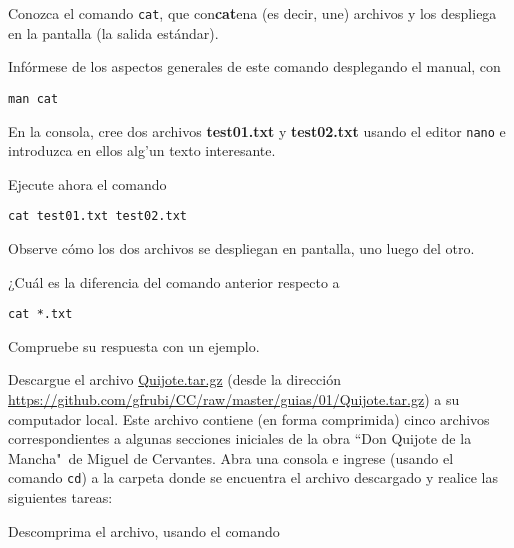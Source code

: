\documentclass[11pt]{exam}
\begin{document}
\begin{questions}

\item Conozca el comando \texttt{cat}, que con\textbf{cat}ena (es decir, une) archivos y los despliega en la pantalla (la salida estándar).
\begin{parts}
\item  Infórmese de los aspectos generales de este comando desplegando el manual, con 

\begin{verbatim}
man cat
\end{verbatim}



\item En la consola, cree dos archivos \textbf{test01.txt} y \textbf{test02.txt} usando el editor \texttt{nano} e introduzca en ellos alg'un texto interesante.

\item Ejecute ahora el comando 

\begin{verbatim}
cat test01.txt test02.txt
\end{verbatim}

Observe cómo los dos archivos se despliegan en pantalla, uno luego del otro.

\item ¿Cuál es la diferencia del comando anterior respecto a 

\begin{verbatim}
cat *.txt
\end{verbatim}

Compruebe su respuesta con un ejemplo.
\end{parts}

\item Descargue el archivo \href{https://github.com/gfrubi/CC/raw/master/guias/01/Quijote.tar.gz}{Quijote.tar.gz} (desde la dirección \url{https://github.com/gfrubi/CC/raw/master/guias/01/Quijote.tar.gz}) a su computador local. Este archivo contiene (en forma comprimida) cinco archivos correspondientes a algunas secciones iniciales de la obra ``Don Quijote de la Mancha"\, de Miguel de Cervantes. Abra una consola e ingrese (usando el comando \texttt{cd}) a la carpeta donde se encuentra el archivo descargado y realice las siguientes tareas:
\begin{parts}
\item Descomprima el archivo, usando el comando 


\end{parts}
\end{questions}
\end{document}
